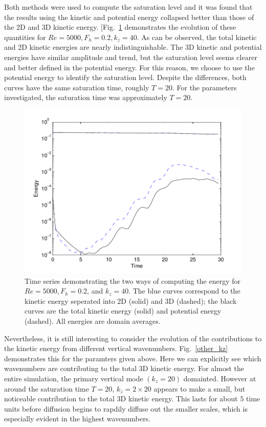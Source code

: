 Both methods were used to compute the saturation level and it was found that the results using the kinetic and potential energy collapsed better than those of the 2D and 3D kinetic energy. [Fig.~\ref{sat_energy} demonstrates the evolution of these quantities for $Re=5000, F_{h}=0.2, k_{z}=40$. As can be observed, the total kinetic and 2D kinetic energies are nearly indistinguishable. The 3D kinetic and potential energies have similar amplitude and trend, but the saturation level seems clearer and better defined in the potential energy. For this reason, we choose to use the potential energy to identify the saturation level. Despite the differences, both curves have the same saturation time, roughly $T=20$. For the parameters investigated, the saturation time was approximately $T=20$. 
\begin{figure}
\begin{center}
\includegraphics[width=\textwidth]{sat_eg_re5000_fh02}
\caption{Time series demonstrating the two ways of computing the energy for $Re=5000, F_{h}=0.2$, and $k_{z}=40$. The blue curves correspond to the kinetic energy seperated into 2D (solid) and 3D (dashed); the black curves are the total kinetic energy (solid) and potential energy (dashed). All energies are domain averages.}
\label{sat_energy}
\end{center}
\end{figure}
Nevertheless, it is still interesting to consider the evolution of the contributions to the kinetic energy from different vertical wavenumbers. Fig.~\ref{other_kz} demonstrates this for the paramters given above. Here we can explicitly see which wavenumbers are contributing to the total 3D kinetic energy. For almost the entire simulation, the primary vertical mode $(k_{z}=20)$ domainted. However at around the saturation time $T=20$, $k_{z}=2\times 20$ appears to make a small, but noticeable contribution to the total 3D kinetic energy. This lasts for about $5$ time units before diffusion begins to rapdily diffuse out the smaller scales, which is especially evident in the highest wavenumbers. 
